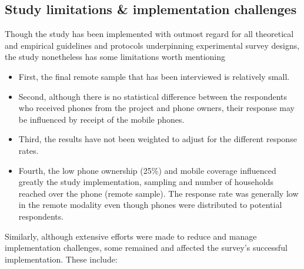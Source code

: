 \documentclass[11pt,harvard]{article}
\begin{document}
	\subsection{Study limitations \& implementation challenges}
	Though the study has been implemented with outmost regard for all theoretical and empirical guidelines and protocols underpinning experimental survey designs, the study nonetheless has some limitations worth mentioning
	\begin{itemize}
		\item First, the final remote sample that has been interviewed is relatively small. 
		\item Second, although there is no statistical difference between the respondents who received phones from the project and phone owners, their response may be influenced by receipt of the mobile phones. 
		\item Third, the results have not been weighted to adjust for the different response rates.
		\item Fourth, the low phone ownership (25\%) and mobile coverage influenced greatly the study implementation, sampling and number of households reached over the phone (remote sample). The response rate was generally low in the remote modality even though phones were distributed to potential respondents.
	\end{itemize}
	
	Similarly, although extensive efforts were made to reduce and manage implementation challenges, some remained and affected the survey's successful implementation. These include:
	
\end{document}
